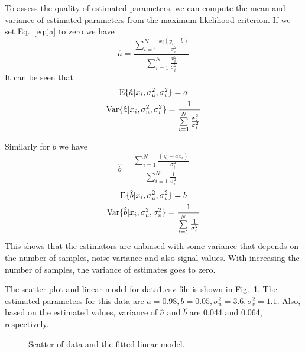 \documentclass[12pt]{elsarticle}
\begin{document}
To assess the quality of estimated parameters, we can compute the mean and variance of estimated parameters from the maximum likelihood criterion. If we set Eq.~\eqref{eq:ja} to zero we have 
\begin{equation}
\hat{a}= \frac{\sum \limits_{i=1}^{N}\frac{x_i (y_i-b)}{\sigma_i^2} }{\sum
\limits_{i=1}^N  \frac{x_i^2}{\sigma_i^2}}
\end{equation}
It can be seen that
\begin{gather}
{\mathrm {E}}\{\hat{a} | x_i,\sigma_u^2,\sigma_v^2 \}= a \\
{\mathrm {Var}}\{\hat{a} | x_i,\sigma_u^2,\sigma_v^2 \}= \frac{1}{\sum \limits_{i=1}^N \frac{x_i^2}{\sigma_i^2}}
\end{gather}


Similarly for $b$ we have 
\begin{equation}
\hat{b}= \frac{\sum \limits_{i=1}^{N}\frac{(y_i-a x_i)}{\sigma_i^2} }{\sum
\limits_{i=1}^N  \frac{1}{\sigma_i^2}}
\end{equation}
\begin{gather}
{\mathrm {E}}\{\hat{b}|x_i,\sigma_u^2,\sigma_v^2 \}= b \\
{\mathrm {Var}}\{\hat{b} |x_i,\sigma_u^2,\sigma_v^2 \}= \frac{1}{\sum \limits_{i=1}^N \frac{1}{\sigma_i^2}}
\end{gather}
This shows that the estimators are unbiased with some variance that depends on the number of samples, noise variance and also signal values.
With increasing the number of samples, the variance of estimates goes to zero.

The scatter plot and linear model for data1.csv file is shown in Fig.~\ref{fig:xyplot}. The estimated parameters for this data are
$a=0.98, b=0.05, \sigma_u^2=3.6, \sigma_v^2=1.1 $. Also, based on the estimated values, variance of $\hat{a}$ and $\hat{b}$ are 0.044 and 0.064, respectively.


\begin{figure}[h!]
\centerline{}
\caption{{Scatter of data and the fitted linear model.}}
\label{fig:xyplot}
\end{figure}



%
%
\end{document}
